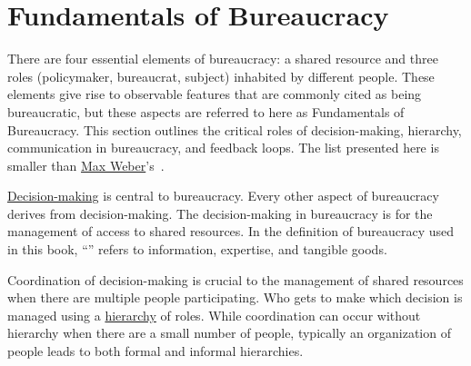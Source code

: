 \section{Fundamentals of Bureaucracy\label{sec:fundamentals-of-b}}

There are four essential elements of bureaucracy: a shared resource and three roles (policymaker, bureaucrat, subject) inhabited by different people. 
These elements give rise to observable features that are commonly cited as being bureaucratic, but these aspects are referred to here as Fundamentals of Bureaucracy.
This section outlines the critical roles of decision-making, hierarchy, communication in bureaucracy, and feedback loops. 
The list presented here is smaller than \href{https://en.wikipedia.org/wiki/Bureaucracy\%23Max_Weber}{Max Weber}'s~\cite{2015_Weber}.

\hyperref[sec:decision-making]{Decision-making}
%
is central to bureaucracy. Every other aspect of bureaucracy derives from decision-making. 
The decision-making in bureaucracy is for the management of access to shared resources. In the definition of bureaucracy used in this book, ``\iftoggle{glossarysubstitutionworks}{\glspl{shared resource}}{shared resources}'' 
\iftoggle{glossaryinmargin}{\marginpar{[Glossary]}}{}%
refers to information, expertise, and tangible goods. %


Coordination of decision-making is crucial to the management of shared resources when there are multiple people participating. Who gets to make which decision is managed using a
\hyperref[sec:hierarchy-of-roles]{hierarchy} of roles.
%
While coordination can occur without hierarchy when there are a small number of people, typically an organization of people leads to both formal and informal hierarchies. 

